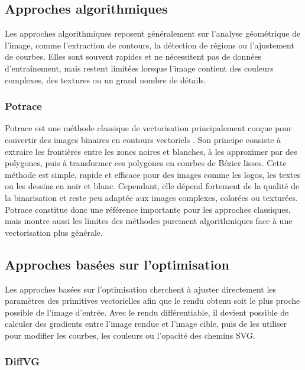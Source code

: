 \documentclass[12pt, a4paper, oneside]{report}
\begin{document}
    \subsection{Approches algorithmiques}

Les approches algorithmiques reposent généralement sur l'analyse géométrique de l'image, comme l'extraction de contours, la détection de régions ou l'ajustement de courbes. Elles sont souvent rapides et ne nécessitent pas de données d'entraînement, mais restent limitées lorsque l'image contient des couleurs complexes, des textures ou un grand nombre de détails.

        \subsubsection{Potrace}

Potrace est une méthode classique de vectorisation principalement conçue pour convertir des images binaires en contours vectoriels \cite{selinger2003potrace}. Son principe consiste à extraire les frontières entre les zones noires et blanches, à les approximer par des polygones, puis à transformer ces polygones en courbes de Bézier lisses. Cette méthode est simple, rapide et efficace pour des images comme les logos, les textes ou les dessins en noir et blanc. Cependant, elle dépend fortement de la qualité de la binarisation et reste peu adaptée aux images complexes, colorées ou texturées. Potrace constitue donc une référence importante pour les approches classiques, mais montre aussi les limites des méthodes purement algorithmiques face à une vectorisation plus générale.

    \subsection{Approches basées sur l'optimisation}

Les approches basées sur l'optimisation cherchent à ajuster directement les paramètres des primitives vectorielles afin que le rendu obtenu soit le plus proche possible de l'image d'entrée. Avec le rendu différentiable, il devient possible de calculer des gradients entre l'image rendue et l'image cible, puis de les utiliser pour modifier les courbes, les couleurs ou l'opacité des chemins SVG.

        \subsubsection{DiffVG}
\end{document}
